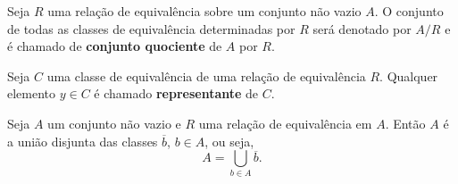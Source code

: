 \documentclass{beamer}
\begin{document}
    \begin{frame}
        \begin{definicao}
            Seja $R$ uma rela\c{c}ão de equivalência sobre um conjunto não vazio $A$. \pause O conjunto de todas as classes de equivalência \pause determinadas por $R$ será \pause denotado por $A/R$ \pause e é chamado de \textbf{conjunto quociente} de $A$ por $R$.\pause
        \end{definicao}
    \end{frame}

    \begin{frame}
        \begin{definicao}
            Seja $C$ uma classe de equivalência \pause de uma relação de equivalência $R$. \pause Qualquer elemento $y\in C$ \pause é chamado \textbf{representante} de $C$.\pause
        \end{definicao}

        \begin{proposicao}
            Seja $A$ um conjunto não vazio \pause e $R$ uma relação de equivalência em $A$. \pause Então $A$ é a união disjunta das classes $\overline{b}$, $b \in A$, ou seja,\pause
            \[
                A = \bigcup_{b\in A}\overline{b}.
            \]
        \end{proposicao}
    \end{frame}
\end{document}

